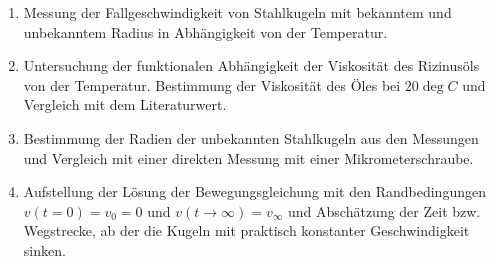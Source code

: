 \documentclass[a4paper,german,12pt,smallheadings]{scrartcl}
\begin{document}
\begin{enumerate}[1.]
  \item Messung der Fallgeschwindigkeit von Stahlkugeln mit bekanntem und
    unbekanntem Radius in Abhängigkeit von der Temperatur.
  \item Untersuchung der funktionalen Abhängigkeit der Viskosität des
    Rizinusöls von der Temperatur. Bestimmung der Viskosität des Öles bei $20
    \deg C$ und Vergleich mit dem Literaturwert.
  \item
    Bestimmung der Radien der unbekannten Stahlkugeln aus den Messungen und
    Vergleich mit einer direkten Messung mit einer Mikrometerschraube.
  \item Aufstellung der Lösung der Bewegungsgleichung mit den Randbedingungen
    $v(t=0) = v_0 = 0$ und $v(t \to \infty) = v_\infty$ und Abschätzung der
    Zeit bzw. Wegstrecke, ab der die Kugeln mit praktisch konstanter
    Geschwindigkeit sinken.
\end{enumerate}
\end{document}

